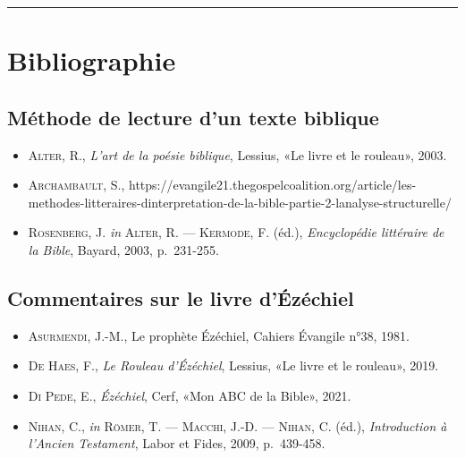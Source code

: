 \begin{center}\rule{0.5\linewidth}{1pt}\end{center}
\section*{Bibliographie}
\subsection*{Méthode de lecture d'un texte biblique}
\begin{itemize}[label=]
\item \textsc{Alter, R.}, \textit{L'art de la poésie biblique}, Lessius, «Le livre et le rouleau», 2003.
\item \textsc{Archambault, S.}, https://evangile21.thegospelcoalition.org/article/les-methodes-litteraires-dinterpretation-de-la-bible-partie-2-lanalyse-structurelle/
\item \textsc{Rosenberg, J.} \textit{in} \textsc{Alter, R. — Kermode, F.} (éd.), \textit{Encyclopédie littéraire de la Bible}, Bayard, 2003, p.~231-255.
\end{itemize}
\subsection*{Commentaires sur le livre d'Ézéchiel}
\begin{itemize}[label=]
\item \textsc{Asurmendi, J.-M.}, Le prophète Ézéchiel, Cahiers Évangile n°38, 1981.
\item \textsc{De Haes, F.}, \textit{Le Rouleau d'Ézéchiel}, Lessius, «Le livre et le rouleau», 2019.
\item \textsc{Di Pede, E.}, \textit{Ézéchiel}, Cerf, «Mon ABC de la Bible», 2021.
\item \textsc{Nihan, C.}, \textit{in} \textsc{Römer, T. — Macchi, J.-D. — Nihan, C.} (éd.), \textit{Introduction à l'Ancien Testament}, Labor et Fides, 2009, p.~439-458.
\end{itemize}